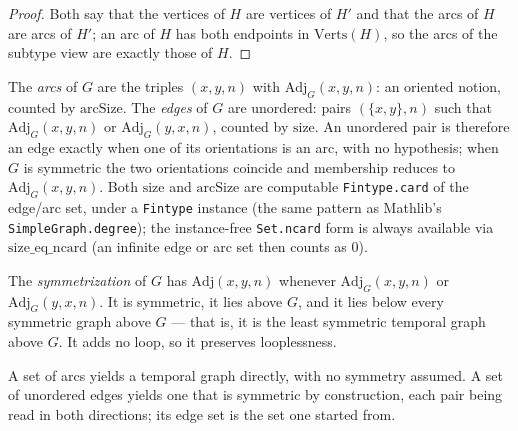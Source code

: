 \begin{proof}
  \leanok
  Both say that the vertices of $H$ are vertices of $H'$ and that the arcs of $H$ are arcs of
  $H'$; an arc of $H$ has both endpoints in $\mathrm{Verts}(H)$, so the arcs of the subtype view
  are exactly those of $H$.
\end{proof}

\begin{definition}
  \label{def:arcset-edgeset}
  \leanok
  The \emph{arcs} of $G$ are the triples $(x,y,n)$ with $\mathrm{Adj}_G(x,y,n)$:
  an oriented notion, counted by $\mathrm{arcSize}$. The
  \emph{edges} of $G$ are unordered: pairs $(\{x,y\}, n)$ such that
  $\mathrm{Adj}_G(x,y,n)$ or $\mathrm{Adj}_G(y,x,n)$, counted by
  $\mathrm{size}$. An unordered pair is therefore an edge exactly when one of
  its orientations is an arc, with no hypothesis; when $G$ is symmetric the
  two orientations coincide and membership reduces to
  $\mathrm{Adj}_G(x,y,n)$. Both $\mathrm{size}$ and $\mathrm{arcSize}$ are
  computable \texttt{Fintype.card} of the edge/arc set, under a
  \texttt{Fintype} instance (the same pattern as Mathlib's
  \texttt{SimpleGraph.degree}); the instance-free \texttt{Set.ncard} form is
  always available via $\mathrm{size\_eq\_ncard}$ (an infinite edge or arc set
  then counts as $0$).
\end{definition}

\begin{definition}[Symmetrization]
  \label{def:symmetrize}
  \leanok
  The \emph{symmetrization} of $G$ has $\mathrm{Adj}(x,y,n)$ whenever
  $\mathrm{Adj}_G(x,y,n)$ or $\mathrm{Adj}_G(y,x,n)$. It is symmetric, it lies
  above $G$, and it lies below every symmetric graph above $G$ — that is, it is
  the least symmetric temporal graph above $G$. It adds no loop, so it
  preserves looplessness.
\end{definition}

\begin{definition}
  \label{def:from-arc-edge-set}
  \leanok
  A set of arcs yields a temporal graph directly, with no symmetry assumed. A
  set of unordered edges yields one that is symmetric by construction, each
  pair being read in both directions; its edge set is the set one started
  from.
\end{definition}

